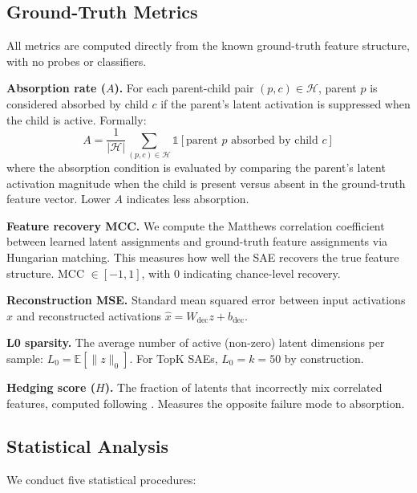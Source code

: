 \documentclass{article}
\begin{document}
\subsection{Ground-Truth Metrics}

All metrics are computed directly from the known ground-truth feature structure, with no probes or classifiers.

\textbf{Absorption rate ($A$).} For each parent-child pair $(p, c) \in \mathcal{H}$, parent $p$ is considered absorbed by child $c$ if the parent's latent activation is suppressed when the child is active. Formally:
\begin{equation}
A = \frac{1}{|\mathcal{H}|} \sum_{(p,c) \in \mathcal{H}} \mathbb{1}[\text{parent } p \text{ absorbed by child } c]
\end{equation}
where the absorption condition is evaluated by comparing the parent's latent activation magnitude when the child is present versus absent in the ground-truth feature vector. Lower $A$ indicates less absorption.

\textbf{Feature recovery MCC.} We compute the Matthews correlation coefficient between learned latent assignments and ground-truth feature assignments via Hungarian matching. This measures how well the SAE recovers the true feature structure. MCC $\in [-1, 1]$, with 0 indicating chance-level recovery.

\textbf{Reconstruction MSE.} Standard mean squared error between input activations $x$ and reconstructed activations $\hat{x} = W_{\text{dec}} z + b_{\text{dec}}$.

\textbf{L0 sparsity.} The average number of active (non-zero) latent dimensions per sample: $L_0 = \mathbb{E}[\|z\|_0]$. For TopK SAEs, $L_0 = k = 50$ by construction.

\textbf{Hedging score ($H$).} The fraction of latents that incorrectly mix correlated features, computed following \citet{chanin2025hedging}. Measures the opposite failure mode to absorption.

\subsection{Statistical Analysis}

We conduct five statistical procedures:
\end{document}
